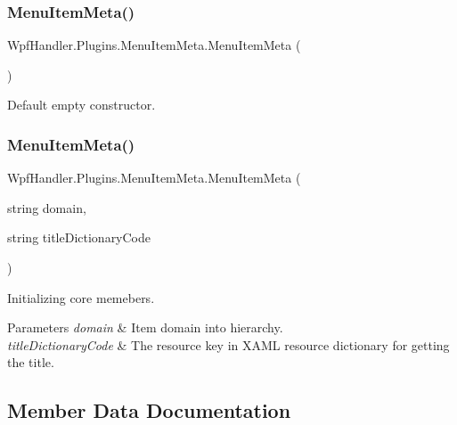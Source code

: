 \subsubsection{\texorpdfstring{Menu\+Item\+Meta()}{MenuItemMeta()}\hspace{0.1cm}{\footnotesize\ttfamily [1/2]}}
{\footnotesize\ttfamily Wpf\+Handler.\+Plugins.\+Menu\+Item\+Meta.\+Menu\+Item\+Meta (\begin{DoxyParamCaption}{ }\end{DoxyParamCaption})}



Default empty constructor. 

\mbox{\label{class_wpf_handler_1_1_plugins_1_1_menu_item_meta_a0151fef18aa63b197c0dda26fd3a01eb}} 
\subsubsection{\texorpdfstring{Menu\+Item\+Meta()}{MenuItemMeta()}\hspace{0.1cm}{\footnotesize\ttfamily [2/2]}}
{\footnotesize\ttfamily Wpf\+Handler.\+Plugins.\+Menu\+Item\+Meta.\+Menu\+Item\+Meta (\begin{DoxyParamCaption}\item[{string}]{domain,  }\item[{string}]{title\+Dictionary\+Code }\end{DoxyParamCaption})}



Initializing core memebers. 


\begin{DoxyParams}{Parameters}
{\em domain} & Item domain into hierarchy.\\
\hline
{\em title\+Dictionary\+Code} & The resource key in X\+A\+ML resource dictionary for getting the title.\\
\hline
\end{DoxyParams}


\subsection{Member Data Documentation}
\mbox{\label{class_wpf_handler_1_1_plugins_1_1_menu_item_meta_a8071dad94e312ee2c0038e7c1689df23}} 
